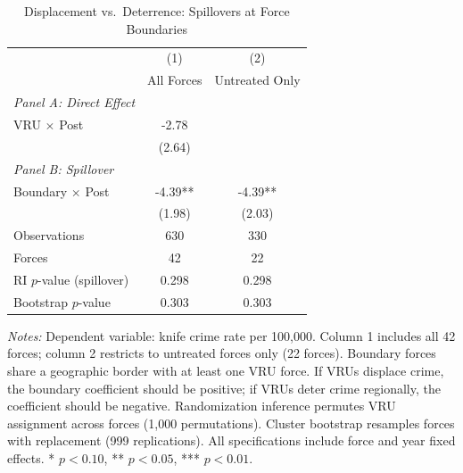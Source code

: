 \begin{table}[htbp]
\centering
\caption{Displacement vs.\ Deterrence: Spillovers at Force Boundaries}
\label{tab:spillover}
\begin{threeparttable}
\begin{tabular}{lcc}
\toprule
 & (1) & (2) \\
 & All Forces & Untreated Only \\
\midrule
\emph{Panel A: Direct Effect} & & \\
VRU $\times$ Post & -2.78 & \\
 & (2.64) & \\
[0.5em]
\emph{Panel B: Spillover} & & \\
Boundary $\times$ Post & -4.39** & -4.39** \\
 & (1.98) & (2.03) \\
[0.5em]
Observations & 630 & 330 \\
Forces & 42 & 22 \\
RI $p$-value (spillover) & 0.298 & 0.298 \\
Bootstrap $p$-value & 0.303 & 0.303 \\
\bottomrule
\end{tabular}
\begin{tablenotes}[flushleft]\footnotesize
\item \textit{Notes:} Dependent variable: knife crime rate per 100,000. Column 1 includes all 42 forces; column 2 restricts to untreated forces only (22 forces). Boundary forces share a geographic border with at least one VRU force. If VRUs displace crime, the boundary coefficient should be positive; if VRUs deter crime regionally, the coefficient should be negative. Randomization inference permutes VRU assignment across forces (1,000 permutations). Cluster bootstrap resamples forces with replacement (999 replications). All specifications include force and year fixed effects. * $p < 0.10$, ** $p < 0.05$, *** $p < 0.01$.
\end{tablenotes}
\end{threeparttable}
\end{table}

